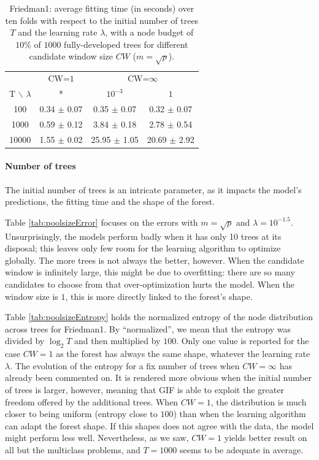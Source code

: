 \documentclass{article}
\begin{document}
\begin{table}[t]
\caption{Friedman1: average fitting time (in seconds) over ten folds with 
respect to the initial number of trees $T$ and the learning rate $\lambda$, 
with a node budget of $10\%$ of $1000$ fully-developed trees for different 
candidate window size $CW$ ($m=\sqrt{p}$).}
\label{tab:poolsizeTime}
\begin{center}
\begin{small}
\begin{tabular}{c|c|cc}
\hline
 & CW=$1$ & \multicolumn{2}{c}{CW=$\infty$} \\
T $\backslash$ $\lambda$ & * & $10^{-3}$ &  $1$ \\
\hline
100 & 0.34 $\pm$ 0.07 & 0.35 $\pm$ 0.07 &  0.32 $\pm$ 0.07 \\
1000 & 0.59 $\pm$ 0.12 & 3.84 $\pm$ 0.18 & 2.78 $\pm$ 0.54 \\
10000 & 1.55 $\pm$ 0.02 & 25.95 $\pm$ 1.05 & 20.69 $\pm$ 
2.92 \\
\hline
\end{tabular}
\end{small}
\end{center}
\vskip -0.1in
\end{table}

\paragraph{Number of trees}
The initial number of trees is an intricate parameter, as it impacts the 
model's predictions, the fitting time and the shape of the forest.

Table \ref{tab:poolsizeError} focuses on the errors with $m=\sqrt{p}$ and 
$\lambda=10^{-1.5}$. Unsurprisingly, the models perform badly when it has only 
10 trees at its disposal; this leaves only few room for the learning algorithm 
to optimize globally. The more trees is not always the better, however. When 
the candidate window is infinitely large, this might be due to overfitting: 
there are so many candidates to choose from that over-optimization hurts the 
model. When the window size is $1$, this is more directly linked to the 
forest's shape.

Table \ref{tab:poolsizeEntropy} holds the normalized entropy of the node 
distribution across trees for Friedman1. 
By ``normalized'', we mean that the entropy was divided by $\log_2 T$ and then 
multiplied by $100$.
Only one value is reported for the case $CW=1$ as the forest has always the 
same shape, whatever the learning rate $\lambda$. The evolution of the entropy 
for a fix number of trees when $CW=\infty$ has already been commented on. 
It is rendered more obvious when the initial number of trees is larger, 
however, meaning that GIF is able to exploit the greater freedom offered by the 
additional trees. 
When $CW=1$, the distribution is much closer to being uniform (entropy 
close to $100$) than when the learning algorithm can adapt the forest shape. 
If this shapes does not agree with the data, the model might perform less well. 
Nevertheless, as we saw, $CW=1$ yields better result on all but the multiclass 
problems, and $T=1000$ seems to be adequate in average. %
\end{document}
